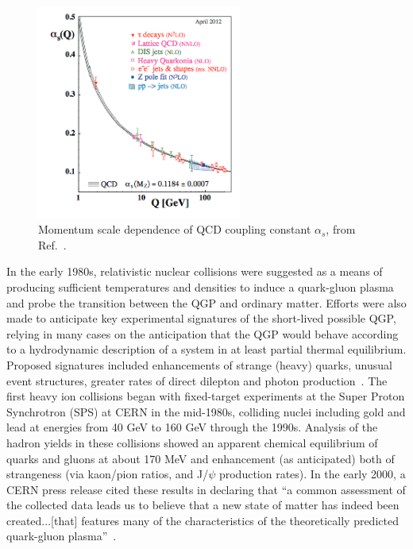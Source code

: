 \begin{figure}[h!]
\begin{center}
\includegraphics[width=0.6\textwidth]{figures/Theory/Alpha_s.png}
\caption[QCD coupling constant $\alpha_{s}$]{Momentum scale dependence of QCD coupling constant $\alpha_{s}$, from Ref.~\cite{Bethke:2012jm}.}
\label{fig:alpha_s}
\end{center}
\end{figure}


In the early 1980s, relativistic nuclear collisions were suggested as a means of producing sufficient temperatures and densities to induce a quark-gluon plasma and probe the transition between the QGP and ordinary matter.  Efforts were also made to anticipate key experimental signatures of the short-lived possible QGP, relying in many cases on the anticipation that the QGP would behave according to a hydrodynamic description of a system in at least partial thermal equilibrium.  Proposed signatures included enhancements of strange (heavy) quarks, unusual event structures, greater rates of direct dilepton and photon production~\cite{Bjorken:1983}.  The first heavy ion collisions began with fixed-target experiments at the Super Proton Synchrotron (SPS) at CERN in the mid-1980s, colliding nuclei including gold and lead at energies from 40 GeV to 160 GeV through the 1990s.  Analysis of the hadron yields in these collisions showed an apparent chemical equilibrium of quarks and gluons at about 170 MeV and enhancement (as anticipated) both of strangeness (via kaon/pion ratios, and J/$\psi$ production rates).  In the early 2000, a CERN press release cited these results in declaring that ``a common assessment of the collected data leads us to believe that a new state of matter has indeed been created...[that] features many of the characteristics of the theoretically predicted quark-gluon plasma''~\cite{Heinz:2000bk}.

